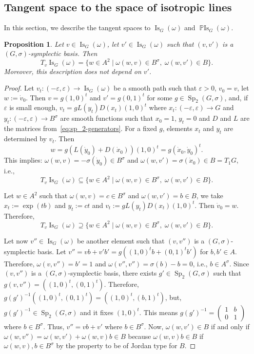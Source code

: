 \documentclass[a4paper,oneside,11pt]{amsart}
\DeclareMathOperator{\Sp}{Sp}
\DeclareMathOperator{\Is}{Is}
\DeclareMathOperator{\PIs}{\mathbb{P}Is}
\theoremstyle{plain}
\newtheorem{prop}[teo]{Proposition}
\theoremstyle{definition}
\theoremstyle{remark}
\begin{document}
\subsection{Tangent space to the space of isotropic lines}

In this section, we describe the tangent spaces to $\Is_G(\omega)$ and $\PIs_G(\omega)$.

\begin{prop}
    Let $v\in\Is_G(\omega)$, let $v'\in\Is_G(\omega)$ such that $(v,v')$ is a $(G,\sigma)$-symplectic basis. Then
    $$T_v\Is_G(\omega)=\{w\in A^2\mid \omega(w,v)\in B^\sigma,\;\omega(w,v')\in B\}.$$
    Moreover, this description does not depend on $v'$.
\end{prop}

\begin{proof}
    Let $v_t\colon (-\varepsilon,\varepsilon)\to \Is_G(\omega)$ be a smooth path such that $\varepsilon>0$, $v_0=v$, let $w:=\dot v_0$. Then $v=g(1,0)^t$ and $v'=g(0,1)^t$ for some $g\in\Sp_2(G,\sigma)$, and, if $\varepsilon$ is small enough, $v_t=g L(y_t)D(x_t)(1,0)^t$ where $x_t\colon(-\varepsilon,\varepsilon)\to G$ and $y_t\colon(-\varepsilon,\varepsilon)\to B^\sigma$ are smooth functions such that $x_0=1$, $y_t=0$ and $D$ and $L$ are the matrices from~\eqref{eq:sp_2-generators}. For a fixed $g$, elements $x_t$ and $y_t$ are determined by $v_t$. Then
    $$w=g(L(\dot y_0)+D(\dot x_0))(1,0)^t=g(\dot x_0,\dot y_0)^t.$$
    This implies: $\omega(w,v)=-\sigma(\dot y_0)\in B^\sigma$ and $\omega(w,v')=\sigma(\dot x_0)\in B=T_1G$, i.e.,
    $$T_v\Is_G(\omega)\subseteq \{w\in A^2\mid \omega(w,v)\in B^\sigma,\;\omega(w,v')\in B\}.$$

    Let $w\in A^2$ such that $\omega(w,v)=c\in B^\sigma$ and $\omega(w,v')=b\in B$, we take $x_t:=\exp(tb)$ and $y_t:=ct$ and $v_t:=g L(y_t)D(x_t)(1,0)^t$. Then $\dot v_0=w$. Therefore,
    $$T_v\Is_G(\omega)\supseteq \{w\in A^2\mid \omega(w,v)\in B^\sigma,\;\omega(w,v')\in B\}.$$

    Let now $v''\in \Is_G(\omega)$ be another element such that $(v,v'')$ is a $(G,\sigma)$-symplectic basis.  Let $v''=vb+v'b'=g((1,0)^tb+(0,1)^tb')$ for $b,b'\in A$. Therefore, $\omega(v,v'')=b'=1$ and $\omega(v'',v'')=\sigma(b)-b=0$, i.e., $b\in A^\sigma$. Since  $(v,v'')$ is a $(G,\sigma)$-symplectic basis, there exists $g'\in\Sp_2(G,\sigma)$ such that $g(v,v'')=((1,0)^t,(0,1)^t)$. Therefore, $g(g')^{-1}((1,0)^t,(0,1)^t)=((1,0)^t,(b,1)^t)$, but, $g(g')^{-1}\in\Sp_2(G,\sigma)$ and it fixes $(1,0)^t$. This means $g(g')^{-1}=\begin{pmatrix}
        1 & b \\
        0 & 1
    \end{pmatrix}$ where $b\in B^\sigma$. Thus, $v''=vb+v'$ where $b\in B^\sigma$. Now, $\omega(w,v')\in B$ if and only if $\omega(w,v'')=\omega(w,v')+\omega(w,v)b\in B$ because $\omega(w,v)b\in B$ if $\omega(w,v),b\in B^\sigma$ by the property to be of Jordan type for $B$.
\end{proof}
\end{document}
